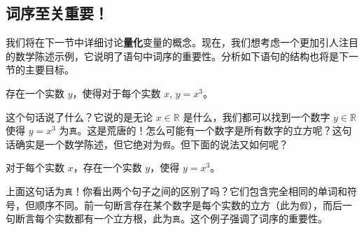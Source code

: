 \subsection{词序至关重要！}\label{sec:section4.2.4}

我们将在下一节中详细讨论\textbf{量化}变量的概念。现在，我们想考虑一个更加引人注目的数学陈述示例，它说明了语句中词序的重要性。分析如下语句的结构也将是下一节的主要目标。
\begin{center}
    存在一个实数 $y$，使得对于每个实数 $x$, $y = x^3$。
\end{center}
这个句话说了什么？它说的是无论 $x \in \mathbb{R}$ 是什么，我们都可以找到一个数字 $y \in \mathbb{R}$ 使得 $y = x^3$ 为\verb|真|。这是荒唐的！怎么可能有一个数字是所有数字的立方呢？这句话确实是一个数学陈述，但它绝对为\verb|假|。但下面的说法又如何呢？
\begin{center}
    对于每个实数 $x$，存在一个实数 $y$，使得 $y = x^3$。
\end{center}
上面这句话为\verb|真|！你看出两个句子之间的区别了吗？它们包含完全相同的单词和符号，但顺序不同。前一句断言存在某个数字是每个实数的立方（此为\verb|假|），而后一句断言每个实数都有一个立方根，此为\verb|真|。这个例子强调了词序的重要性。
